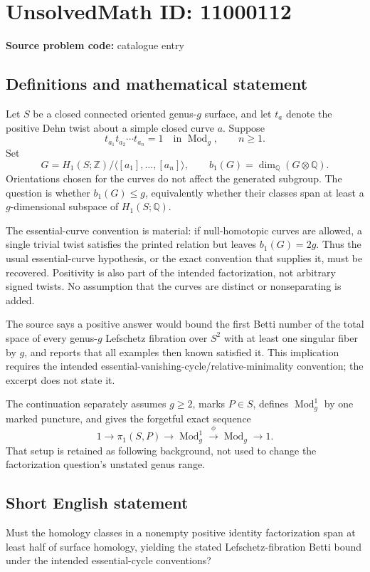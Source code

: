 \documentclass[11pt]{article}
\newcommand{\Z}{\mathbb{Z}}
\newcommand{\Q}{\mathbb{Q}}
\begin{document}
\section*{UnsolvedMath ID: 11000112}
\textbf{Source problem code:} catalogue entry
\subsection{Definitions and mathematical statement}
Let \(S\) be a closed connected oriented genus-\(g\) surface, and let \(t_a\) denote the positive Dehn twist about a simple closed curve \(a\). Suppose
\[
 t_{a_1}t_{a_2}\cdots t_{a_n}=1\quad\text{in }\operatorname{Mod}_g,
 \qquad n\geq1.
\]
Set
\[
 G=H_1(S;\Z)/\langle[a_1],\ldots,[a_n]\rangle,
 \qquad b_1(G)=\dim_\Q(G\otimes\Q).
\]
Orientations chosen for the curves do not affect the generated subgroup. The question is whether \(b_1(G)\leq g\), equivalently whether their classes span at least a \(g\)-dimensional subspace of \(H_1(S;\Q)\).

The essential-curve convention is material: if null-homotopic curves are allowed, a single trivial twist satisfies the printed relation but leaves \(b_1(G)=2g\). Thus the usual essential-curve hypothesis, or the exact convention that supplies it, must be recovered. Positivity is also part of the intended factorization, not arbitrary signed twists. No assumption that the curves are distinct or nonseparating is added.

The source says a positive answer would bound the first Betti number of the total space of every genus-\(g\) Lefschetz fibration over \(S^2\) with at least one singular fiber by \(g\), and reports that all examples then known satisfied it. This implication requires the intended essential-vanishing-cycle/relative-minimality convention; the excerpt does not state it.

The continuation separately assumes \(g\geq2\), marks \(P\in S\), defines \(\operatorname{Mod}_g^1\) by one marked puncture, and gives the forgetful exact sequence
\[
 1\longrightarrow\pi_1(S,P)\longrightarrow
 \operatorname{Mod}_g^1\xrightarrow{\phi}\operatorname{Mod}_g\longrightarrow1.
\]
That setup is retained as following background, not used to change the factorization question's unstated genus range.
\subsection{Short English statement}
Must the homology classes in a nonempty positive identity factorization span at least half of surface homology, yielding the stated Lefschetz-fibration Betti bound under the intended essential-cycle conventions?
\end{document}
